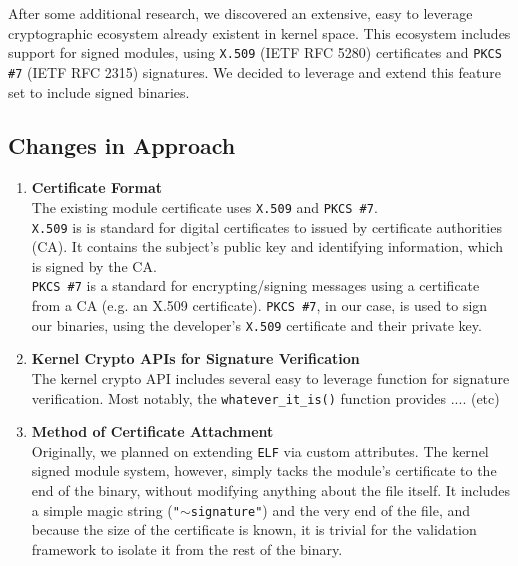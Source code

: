 \documentclass[12pt, letterpaper]{report}
\begin{document}
	After some additional research, we discovered an extensive, easy to leverage cryptographic ecosystem already existent in kernel space. This ecosystem includes support for signed modules, using \texttt{X.509} (IETF RFC 5280) certificates and \texttt{PKCS \#7} (IETF RFC 2315) signatures. We decided to leverage and extend this feature set to include signed binaries. 

	\subsection{Changes in Approach}
		\begin{enumerate}
			\item \textbf{Certificate Format} \\
			
			The existing module certificate uses \texttt{X.509} and \texttt{PKCS \#7}. \\
			
			\texttt{X.509} is is standard for digital certificates to issued by certificate authorities (CA). It contains the subject's public key and identifying information, which is signed by the CA. \\
			
			\texttt{PKCS \#7} is a standard for encrypting/signing messages using a certificate from a CA (e.g. an X.509 certificate). \texttt{PKCS \#7}, in our case, is used to sign our binaries, using the developer's \texttt{X.509} certificate and their private key. \\
			
			\item \textbf{Kernel Crypto APIs for Signature Verification} \\
			
			The kernel crypto API includes several easy to leverage function for signature verification. Most notably, the \texttt{whatever\_it\_is()} function provides .... (etc)
			
			\item \textbf{Method of Certificate Attachment} \\
			
				Originally, we planned on extending \texttt{ELF} via custom attributes. The kernel signed module system, however, simply tacks the module's certificate to the end of the binary, without modifying anything about the file itself. It includes a simple magic string (\texttt{"$\sim$signature"}) and the very end of the file, and because the size of the certificate is known, it is trivial for the validation framework to isolate it from the rest of the binary. 
		\end{enumerate}
\end{document}
